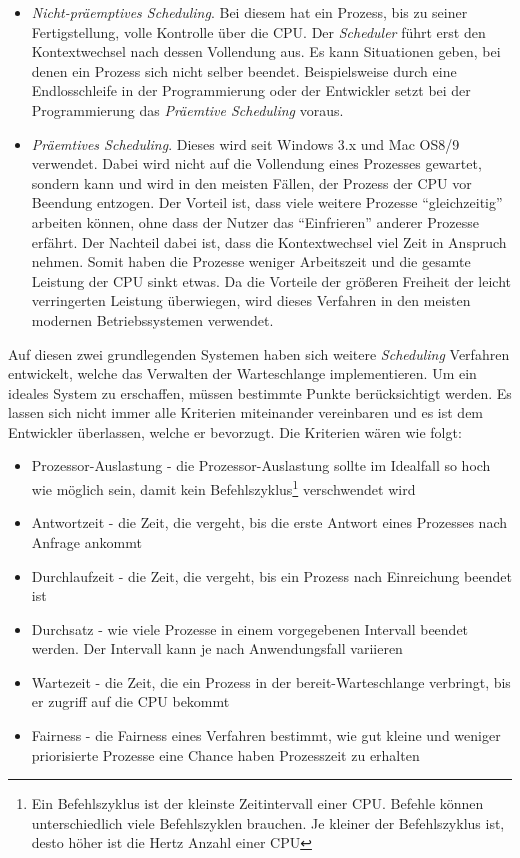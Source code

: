 \begin{itemize}
    \item \textit{Nicht-präemptives Scheduling}. Bei diesem hat ein Prozess, bis zu seiner Fertigstellung, volle Kontrolle über die CPU. Der \textit{Scheduler} führt erst den Kontextwechsel nach dessen Vollendung aus. Es kann Situationen geben, bei denen ein Prozess sich nicht selber beendet. Beispielsweise durch eine Endlosschleife in der Programmierung oder der Entwickler setzt bei der Programmierung das \textit{Präemtive Scheduling} voraus.
    \item \textit{Präemtives Scheduling}. Dieses wird seit Windows 3.x und Mac OS8/9 verwendet. Dabei wird nicht auf die Vollendung eines Prozesses gewartet, sondern kann und wird in den meisten Fällen, der Prozess der CPU vor Beendung entzogen. Der Vorteil ist, dass viele weitere Prozesse ``gleichzeitig'' arbeiten können, ohne dass der Nutzer das ``Einfrieren'' anderer Prozesse erfährt. Der Nachteil dabei ist, dass die Kontextwechsel viel Zeit in Anspruch nehmen. Somit haben die Prozesse weniger Arbeitszeit und die gesamte Leistung der CPU sinkt etwas. Da die Vorteile der größeren Freiheit der leicht verringerten Leistung überwiegen, wird dieses Verfahren in den meisten modernen Betriebssystemen verwendet. \cite{BetriebssystemeKompakt}
\end{itemize}

Auf diesen zwei grundlegenden Systemen haben sich weitere \textit{Scheduling} Verfahren entwickelt, welche das Verwalten der Warteschlange implementieren. Um ein ideales System zu erschaffen, müssen bestimmte Punkte berücksichtigt werden. Es lassen sich nicht immer alle Kriterien miteinander vereinbaren und es ist dem Entwickler überlassen, welche er bevorzugt. Die Kriterien wären wie folgt: \cite{Scheduling:Williams}
\begin{itemize}
    \item Prozessor-Auslastung - die Prozessor-Auslastung sollte im Idealfall so hoch wie möglich sein, damit kein Befehlszyklus\footnote{Ein Befehlszyklus ist der kleinste Zeitintervall einer CPU. Befehle können unterschiedlich viele Befehlszyklen brauchen. Je kleiner der Befehlszyklus ist, desto höher ist die Hertz Anzahl einer CPU} verschwendet wird
    \item Antwortzeit - die Zeit, die vergeht, bis die erste Antwort eines Prozesses nach Anfrage ankommt
    \item Durchlaufzeit - die Zeit, die vergeht, bis ein Prozess nach Einreichung beendet ist
    \item Durchsatz - wie viele Prozesse in einem vorgegebenen Intervall beendet werden. Der Intervall kann je nach Anwendungsfall variieren
    \item Wartezeit - die Zeit, die ein Prozess in der bereit-Warteschlange verbringt, bis er zugriff auf die CPU bekommt
    \item Fairness - die Fairness eines Verfahren bestimmt, wie gut kleine und weniger priorisierte Prozesse eine Chance haben Prozesszeit zu erhalten
\end{itemize}

